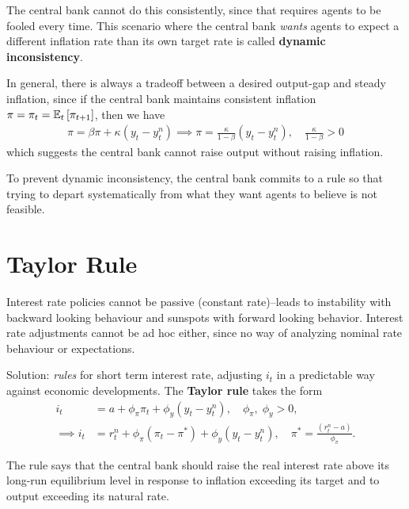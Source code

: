 \documentclass[../main.tex]{subfiles}
\begin{document}
        The central bank cannot do this consistently, since that requires agents to be fooled every time. This scenario where the central bank \emph{wants} agents to expect a different inflation rate than its own target rate is called \textbf{dynamic inconsistency}.
        
        \vspace{0.25cm}

        In general, there is always a tradeoff between a desired output-gap and steady inflation, since if the central bank maintains consistent inflation $\pi = \pi_t = \mathbb{E}_t\left[\pi_{t+1}\right]$, then we have
        \begin{align}
            \pi = \beta \pi + \kappa (y_t - y_t^n)
            \implies \pi = \frac{\kappa}{1-\beta} (y_t - y_t^n),
            \quad \frac{\kappa}{1-\beta} > 0
        \end{align}
        which suggests the central bank cannot raise output without raising inflation.
        
        \vspace{0.25cm}
        
        To prevent dynamic inconsistency, the central bank commits to a rule so that trying to depart systematically from what they want agents to believe is not feasible.
        
        
    \section{Taylor Rule}
    
        Interest rate policies cannot be passive (constant rate)--leads to instability with backward looking behaviour \? %
        and sunspots with forward looking behavior. Interest rate adjustments cannot be ad hoc either, since no way of analyzing nominal rate behaviour or expectations.
        
        \vspace{0.25cm}
        
        Solution: \emph{rules} for short term interest rate, adjusting $i_t$ in a predictable way against economic developments. The \textbf{Taylor rule} takes the form
        \begin{align}
            i_t &= a + \phi_\pi \pi_t + \phi_y (y_t - y_t^n),
            \quad \phi_\pi,\; \phi_y > 0,
            \\
            \implies
            i_t &= r_t^n + \phi_\pi (\pi_t - \pi^*) + \phi_y (y_t - y_t^n),
            \quad \pi^* = \frac{(r_t^n-a)}{\phi_\pi}.
        \end{align}
        
         The rule says that the central bank should raise the real interest rate above its long-run equilibrium level in response to inflation exceeding its target and to output exceeding its natural rate. 
        
        
    
\end{document}
